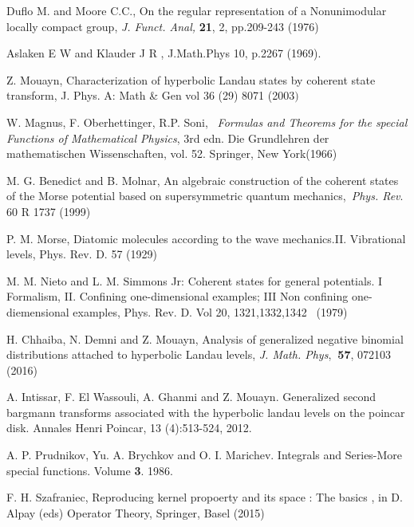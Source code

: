 \begin{thebibliography}{99}
 Duflo M. and Moore C.C., On the regular representation of a
Nonunimodular locally compact group, \textit{J. Funct. Anal,} \textbf{21},
2, pp.209-243 (1976)

 Aslaken E W and Klauder J R , J.Math.Phys 10, p.2267 (1969).

 Z. Mouayn, Characterization of hyperbolic Landau states by
coherent state transform, J. Phys. A: Math \& Gen vol 36 (29) 8071 (2003$)$

 {W. Magnus, F. Oberhettinger, R.P. Soni}, \textit{\ Formulas
and Theorems for the special Functions of Mathematical Physics}, 3rd edn.
Die Grundlehren der mathematischen Wissenschaften, vol. 52. Springer, New
York(1966)

 M. G. Benedict and B. Molnar, An algebraic construction of the
coherent states of the Morse potential based on supersymmetric quantum
mechanics,\textit{\ Phys. Rev}. 60 R 1737 (1999)

 P. M. Morse, Diatomic molecules according to the wave
mechanics.II. Vibrational levels, Phys. Rev. D. 57 (1929)

 M. M. Nieto and L. M. Simmons Jr: Coherent states for general
potentials. I Formalism, II. Confining one-dimensional examples; III Non
confining one-diemensional examples, Phys. Rev. D. Vol 20, 1321,1332,1342 \
(1979)

 H. Chhaiba, N. Demni and Z. Mouayn, Analysis of generalized
negative binomial distributions attached to hyperbolic Landau levels, \emph{%
J. Math. Phys},\textbf{\ 57}, 072103 (2016)

 A. Intissar, F. El Wassouli, A. Ghanmi and Z. Mouayn.
Generalized second bargmann transforms associated with the hyperbolic landau
levels on the poincar disk. Annales Henri Poincar, 13 (4):513-524, 2012.

 A. P. Prudnikov, Yu. A. Brychkov and O. I. Marichev. Integrals
and Series-More special functions. Volume \textbf{3}. 1986.

 F. H. Szafraniec, Reproducing kernel propoerty and its space :
The basics , in D. Alpay (eds) Operator Theory, Springer, Basel (2015)
\end{thebibliography}

